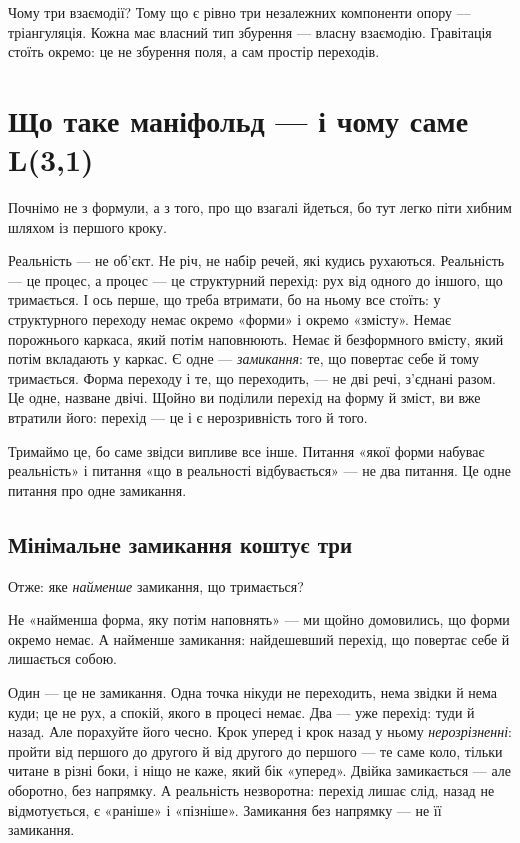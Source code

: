 \documentclass[12pt, a4paper, openany]{book}
\begin{document}
Чому три взаємодії? Тому що є рівно три незалежних компоненти опору --- тріангуляція. Кожна має власний тип збурення --- власну взаємодію. Гравітація стоїть окремо: це не збурення поля, а сам простір переходів.

\section{Що таке маніфольд --- і чому саме L(3,1)}

Почнімо не з формули, а з того, про що взагалі йдеться, бо тут легко піти хибним шляхом із першого кроку.

Реальність --- не об'єкт. Не річ, не набір речей, які кудись рухаються. Реальність --- це процес, а процес --- це структурний перехід: рух від одного до іншого, що тримається. І ось перше, що треба втримати, бо на ньому все стоїть: у структурного переходу немає окремо «форми» і окремо «змісту». Немає порожнього каркаса, який потім наповнюють. Немає й безформного вмісту, який потім вкладають у каркас. Є одне --- \emph{замикання}: те, що повертає себе й тому тримається. Форма переходу і те, що переходить, --- не дві речі, з'єднані разом. Це одне, назване двічі. Щойно ви поділили перехід на форму й зміст, ви вже втратили його: перехід --- це і є нерозривність того й того.

Тримаймо це, бо саме звідси випливе все інше. Питання «якої форми набуває реальність» і питання «що в реальності відбувається» --- не два питання. Це одне питання про одне замикання.

\subsection{Мінімальне замикання коштує три}

Отже: яке \emph{найменше} замикання, що тримається?

Не «найменша форма, яку потім наповнять» --- ми щойно домовились, що форми окремо немає. А найменше замикання: найдешевший перехід, що повертає себе й лишається собою.

Один --- це не замикання. Одна точка нікуди не переходить, нема звідки й нема куди; це не рух, а спокій, якого в процесі немає. Два --- уже перехід: туди й назад. Але порахуйте його чесно. Крок уперед і крок назад у ньому \emph{нерозрізненні}: пройти від першого до другого й від другого до першого --- те саме коло, тільки читане в різні боки, і ніщо не каже, який бік «уперед». Двійка замикається --- але оборотно, без напрямку. А реальність незворотна: перехід лишає слід, назад не відмотується, є «раніше» і «пізніше». Замикання без напрямку --- не її замикання.
\end{document}
